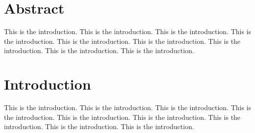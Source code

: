 \documentclass[a4paper,11pt]{report}
\begin{document}

\chapter*{\Large \center Abstract}
This is the introduction.
This is the introduction.
This is the introduction.
This is the introduction.
This is the introduction.
This is the introduction.
This is the introduction.
This is the introduction.
This is the introduction.



\tableofcontents
\listoffigures
\listoftables
\chapter{Introduction}
\label{sec:org5128d0a}
This is the introduction.
This is the introduction.
This is the introduction.
This is the introduction.
This is the introduction.
This is the introduction.
This is the introduction.
This is the introduction.
This is the introduction.
\end{document}
